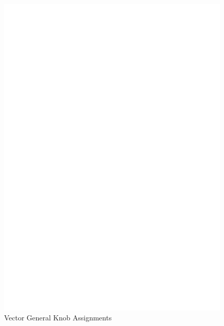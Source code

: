 \begin{figure}
\centering \includegraphics{fig-vg-knobs.ps}
\caption{Vector General Knob Assignments}
\label{vg-knobs}
\end{figure}

